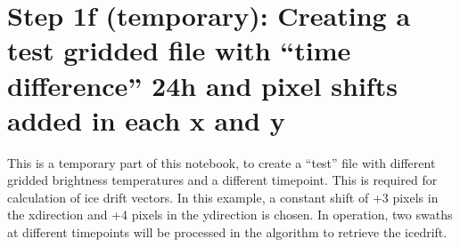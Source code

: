 \documentclass[letterpaper,10pt,english]{jupyterBook}
\begin{document}
\section{Step 1f (temporary): Creating a test gridded file with “time difference” 24h and pixel shifts added in each x and y}
\label{\detokenize{CIMR_L2_Sea_Ice_Drift_algorithm:step-1f-temporary-creating-a-test-gridded-file-with-time-difference-24h-and-pixel-shifts-added-in-each-x-and-y}}
\sphinxAtStartPar
This is a temporary part of this notebook, to create a “test” file with different gridded brightness temperatures and a different timepoint. This is required for calculation of ice drift vectors. In this example, a constant shift of +3 pixels in the x\sphinxhyphen{}direction and +4 pixels in the y\sphinxhyphen{}direction is chosen. In operation, two swaths at different timepoints will be processed in the algorithm to retrieve the icedrift.
\end{document}
